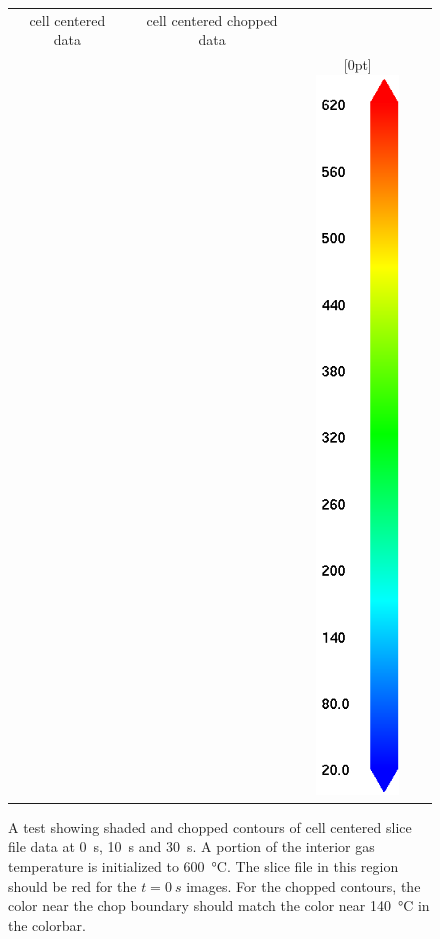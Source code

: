 \documentclass[11pt,twoside]{book}
\begin{document}
\begin{figure}[bph]
\begin{center}
\begin{tabular}{cccp{1.0in}}
 cell centered data&cell centered chopped data\\
 &&\raisebox{0.5in}[0pt]{\includegraphics[height=7.5in]{FIGURES/colorbar_20_620}}\\
 \end{tabular}
\end{center}
 \caption[A test showing shaded and chopped contours of cell centered slice file
 data]{A test showing shaded and chopped contours of cell centered slice file data
 at \SI{0}{s}, \SI{10}{s} and \SI{30}{s}.  A portion of the interior gas temperature
 is initialized to \SI{600}{\degreeCelsius}.  The slice file in this region should
 be red for the $t=\SI{0}{s}$ images.  For the chopped contours, the color near the
 chop boundary should match the color near \SI{140}{\degreeCelsius} in the colorbar.}
\label{figcellaslicetest}%
\end{figure}
\end{document}
